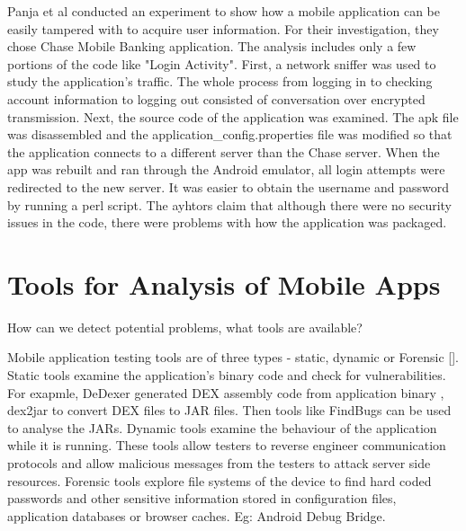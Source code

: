 \documentclass{mproj}
\begin{document}
Panja et al conducted an experiment to show how a mobile application can be easily tampered with to acquire user information. For their investigation, they chose Chase Mobile Banking application. The analysis includes only a few portions of the code like "Login Activity". First, a network sniffer was used to study the application's traffic. The whole process from logging in to checking account information  to logging out consisted of conversation over encrypted transmission. Next, the source code of the application was examined. The apk file was disassembled and the application\_config.properties file was modified so that the application connects to a different server than the Chase server. When the app was rebuilt and ran through the Android emulator, all login attempts were redirected to the new server. It was easier to obtain the username and password by running a perl script. The ayhtors claim that although there were no security issues in the code, there were problems with how the application was packaged.


\section{Tools for Analysis of Mobile Apps}

How can we detect potential problems, what tools are available?

Mobile application testing tools are of three types - static, dynamic or Forensic []. Static tools examine the application's binary code and check for vulnerabilities. For exapmle, DeDexer generated DEX assembly code from application binary , dex2jar to convert DEX files to JAR files. Then tools like FindBugs can be used to analyse the JARs. Dynamic tools examine the behaviour of the application while it is running. These tools allow testers to reverse engineer communication protocols and allow malicious messages from the testers to attack server side resources. Forensic tools explore file systems of the device to find hard coded passwords and other sensitive information stored in configuration files, application databases or browser caches. Eg: Android Debug Bridge.
\end{document}
